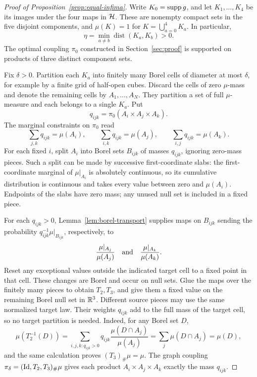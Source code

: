 \begin{proof}[Proof of Proposition~\ref{prop:equal-infima}]
Write \(K_0=\operatorname{supp} g\), and let \(K_1,\ldots,K_4\) be its images under
the four maps in \(\mathcal H\). These are nonempty compact sets in the five
disjoint components, and \(\mu(K)=1\) for \(K=\bigcup_{a=0}^4K_a\).
In particular,
\[
 \eta=\min_{a\ne b}\operatorname{dist}(K_a,K_b)>0.
\]
The optimal coupling \(\pi_0\) constructed in Section~\ref{sec:proof}
is supported on products of three distinct component sets.

Fix \(\delta>0\). Partition each \(K_a\) into finitely many Borel cells
of diameter at most \(\delta\), for example by a finite grid of half-open
cubes. Discard the cells of zero \(\mu\)-mass and denote the remaining
cells by \(A_1,\ldots,A_N\). They partition a set of full \(\mu\)-measure
and each belongs to a single \(K_a\). Put
\[
 q_{ijk}=\pi_0(A_i\times A_j\times A_k).
\]
The marginal constraints on \(\pi_0\) read
\[
 \sum_{j,k}q_{ijk}=\mu(A_i),\qquad
 \sum_{i,k}q_{ijk}=\mu(A_j),\qquad
 \sum_{i,j}q_{ijk}=\mu(A_k).
\]
For each fixed \(i\), split \(A_i\) into Borel sets \(B_{ijk}\) of masses
\(q_{ijk}\), ignoring zero-mass pieces. Such a split can be made by
successive first-coordinate slabs: the first-coordinate marginal of
\(\mu|_{A_i}\) is absolutely continuous, so its cumulative distribution
is continuous and takes every value between zero and \(\mu(A_i)\).
Endpoints of the slabs have zero mass; any unused null set is included
in a fixed piece.

For each \(q_{ijk}>0\), Lemma~\ref{lem:borel-transport} supplies maps on
\(B_{ijk}\) sending the probability \(q_{ijk}^{-1}\mu|_{B_{ijk}}\),
respectively, to
\[
 \frac{\mu|_{A_j}}{\mu(A_j)}
 \quad\hbox{and}\quad
 \frac{\mu|_{A_k}}{\mu(A_k)}.
\]
Reset any exceptional values outside the indicated target cell to a
fixed point in that cell. These changes are Borel and occur on null
sets. Glue the maps over the finitely many pieces to obtain \(T_2,T_3\),
and give them a fixed value on the remaining Borel null set in \(\mathbb R^3\).
Different source pieces may use the same normalized target law. Their
weights \(q_{ijk}\) add to the full mass of the target cell, so no target
partition is needed. Indeed,
for any Borel set \(D\),
\[
 \mu(T_2^{-1}(D))
 =\sum_{i,j,k:q_{ijk}>0}q_{ijk}
       \frac{\mu(D\cap A_j)}{\mu(A_j)}
 =\sum_j\mu(D\cap A_j)=\mu(D),
\]
and the same calculation proves \((T_3)_\#\mu=\mu\).
The graph coupling \(\pi_\delta=(\operatorname{Id},T_2,T_3)_\#\mu\) gives each product
\(A_i\times A_j\times A_k\) exactly the mass \(q_{ijk}\).


\end{proof}
